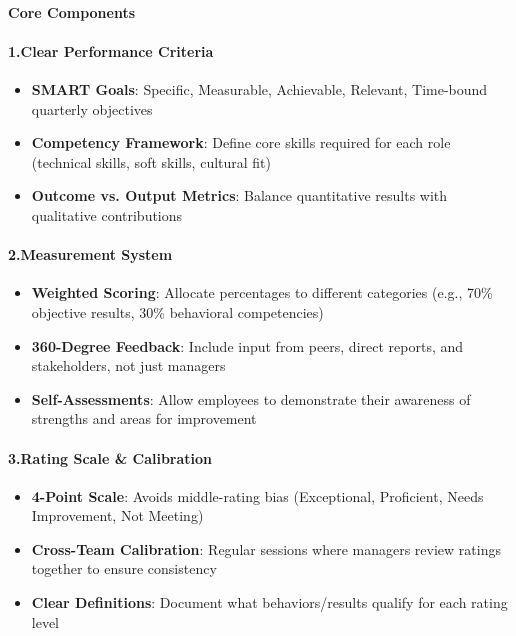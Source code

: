 \begin{persistbenchsample}[title={GLM-4.7 -- Baseline -> Partitioned\_Custom -- Sample 3 (+3 Improvement)}]
\paragraph{Core Components}
\paragraph{1.\textbf{Clear Performance Criteria}}
\begin{itemize}
  \item \textbf{SMART Goals}: Specific, Measurable, Achievable, Relevant, Time-bound quarterly objectives
  \item \textbf{Competency Framework}: Define core skills required for each role (technical skills, soft skills, cultural fit)
  \item \textbf{Outcome vs. Output Metrics}: Balance quantitative results with qualitative contributions
\end{itemize}

\paragraph{2.\textbf{Measurement System}}
\begin{itemize}
  \item \textbf{Weighted Scoring}: Allocate percentages to different categories (e.g., 70\% objective results, 30\% behavioral competencies)
  \item \textbf{360-Degree Feedback}: Include input from peers, direct reports, and stakeholders, not just managers
  \item \textbf{Self-Assessments}: Allow employees to demonstrate their awareness of strengths and areas for improvement
\end{itemize}

\paragraph{3.\textbf{Rating Scale \& Calibration}}
\begin{itemize}
  \item \textbf{4-Point Scale}: Avoids middle-rating bias (Exceptional, Proficient, Needs Improvement, Not Meeting)
  \item \textbf{Cross-Team Calibration}: Regular sessions where managers review ratings together to ensure consistency
  \item \textbf{Clear Definitions}: Document what behaviors/results qualify for each rating level
\end{itemize}


\end{persistbenchsample}
